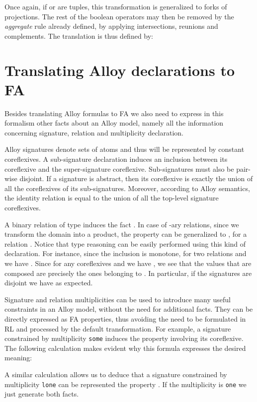 \documentclass{llncs}
\begin{document}
Once again, if  or  are tuples, this transformation is generalized to forks of  projections. The rest of the boolean operators may then be removed by the \emph{aggregate} rule already defined, by applying intersections, reunions and complements. The translation is thus defined by:


\section{Translating Alloy declarations to FA}
\label{sec:alloydecls}

Besides translating Alloy formulas to FA we also need to express in
this formalism other facts about an Alloy model, namely all the
information concerning signature, relation and multiplicity
declaration.

Alloy signatures denote sets of atoms and thus will be represented by
constant coreflexives. A sub-signature declaration induces an
inclusion between its coreflexive and the super-signature
coreflexive. Sub-signatures must also be pair-wise disjoint. If a
signature is abstract, then its coreflexive is exactly the union of
all the coreflexives of its sub-signatures. Moreover, according to
Alloy semantics, the identity relation is equal to the union of all the
top-level signature coreflexives.

A binary relation of type  induces the fact . In case of -ary relations, since we transform the domain into a product, the property can be generalized to , for a relation . Notice that type reasoning can be easily performed using this kind of declaration. For instance,
since the inclusion is monotone, for two relations  and  we have . Since for any coreflexives
 and  we have , we see
that the values that are composed are precisely the ones belonging to
. In particular, if the signatures are disjoint we
have  as expected.


Signature and relation multiplicities can be used to introduce many
useful constraints in an Alloy model, without the need for additional
facts. They can be directly expressed as FA properties, thus avoiding
the need to be formulated in RL and processed by the default
transformation. For example, a signature  constrained by
multiplicity \texttt{some} induces the property  involving its coreflexive. The following
calculation makes evident why this formula expresses the desired
meaning:

A similar calculation allows us to deduce that a signature 
constrained by multiplicity \texttt{lone} can be represented the
property . If the
multiplicity is \texttt{one} we just generate both facts.
\end{document}
